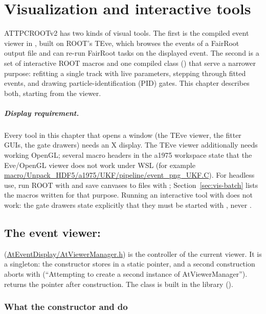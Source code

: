 \chapter{Visualization and interactive tools}
\label{ch:visualization}

ATTPCROOTv2 has two kinds of visual tools. The first is the compiled event viewer in
, built on ROOT's TEve, which browses the events of a FairRoot output file
and can re-run FairRoot tasks on the displayed event. The second is a set of interactive ROOT
macros and one compiled class () that serve a narrower purpose: refitting a
single track with live parameters, stepping through fitted events, and drawing particle-identification
(PID) gates. This chapter describes both, starting from the viewer.

\paragraph{Display requirement.} Every tool in this chapter that opens a window (the TEve
viewer, the fitter GUIs, the gate drawers) needs an X display. The TEve viewer additionally needs
working OpenGL; several macro headers in the a1975 workspace state that the Eve/OpenGL viewer does
not work under WSL (for example \url{macro/Unpack_HDF5/a1975/UKF/pipeline/event_png_UKF.C}). For
headless use, run ROOT with  and save canvases to files with
; Section~\ref{sec:vis-batch} lists the macros written for that purpose.
Running an interactive tool with  does not work: the gate drawers state explicitly that
they must be started with , never .

\section{The event viewer: }
\label{sec:vis-viewer}

 (\url{AtEventDisplay/AtViewerManager.h}) is the controller of the current
viewer. It is a singleton: the constructor stores  in a static pointer, and a second
construction aborts with  (``Attempting to create a second instance of
AtViewerManager'').  returns the pointer after construction.
The class is built in the  library ().

\subsection{What the constructor and  do}

